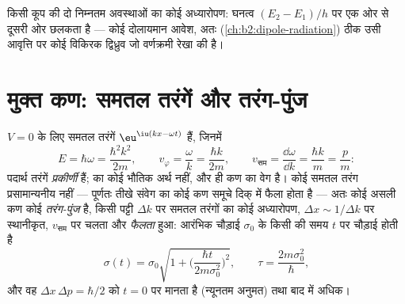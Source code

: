 \begin{omfigure}

{\small किसी कूप की दो निम्नतम अवस्थाओं का कोई अध्यारोपण:
घनत्व  $(E_2 - E_1)/h$ पर एक ओर से दूसरी ओर छलकता है
--- कोई दोलायमान आवेश, अतः (\cref{ch:b2:dipole-radiation})
ठीक उसी आवृत्ति पर कोई विकिरक द्विध्रुव जो वर्णक्रमी रेखा की है।}
\end{omfigure}

\section{मुक्त कण: समतल तरंगें और तरंग-पुंज}

\begin{proposition}[मुक्त कण]\label{prop:b2:schrodinger-wave-functions:free}
$V = 0$ के लिए  समतल तरंगें $\eu^{\iu(kx -
\omega t)}$ हैं, जिनमें
\[
E = \hbar\omega = \frac{\hbar^2k^2}{2m}, \qquad
v_\varphi = \frac{\omega}{k} = \frac{\hbar k}{2m}, \qquad
v_{\text{सम}} = \frac{\dd\omega}{\dd k} = \frac{\hbar k}{m} = \frac{p}{m} :
\]
पदार्थ तरंगें \emph{प्रकीर्णी} हैं;  का कोई भौतिक
अर्थ नहीं, और \emph{} ही कण का वेग है। कोई समतल
तरंग प्रसामान्यनीय नहीं --- पूर्णतः तीखे संवेग का कोई कण
समूचे दिक् में फैला होता है --- अतः कोई असली कण कोई \emph{तरंग-पुंज} है, किसी पट्टी $\Delta k$ पर समतल तरंगों का कोई
अध्यारोपण, $\Delta x \sim 1/\Delta k$ पर स्थानीकृत, $v_{\text{सम}}$ पर चलता और
\emph{फैलता} हुआ: आरंभिक चौड़ाई $\sigma_0$ के किसी  की
समय $t$ पर चौड़ाई होती है
\[
\sigma(t) = \sigma_0\sqrt{1 + \Big(\frac{\hbar t}{2m\sigma_0^2}\Big)^2}, \qquad
\tau = \frac{2m\sigma_0^2}{\hbar} ,
\]
और वह $\Delta x\,\Delta p = \hbar/2$ को $t = 0$ पर मानता है (न्यूनतम अनुमत)
तथा बाद में अधिक।
\end{proposition}

